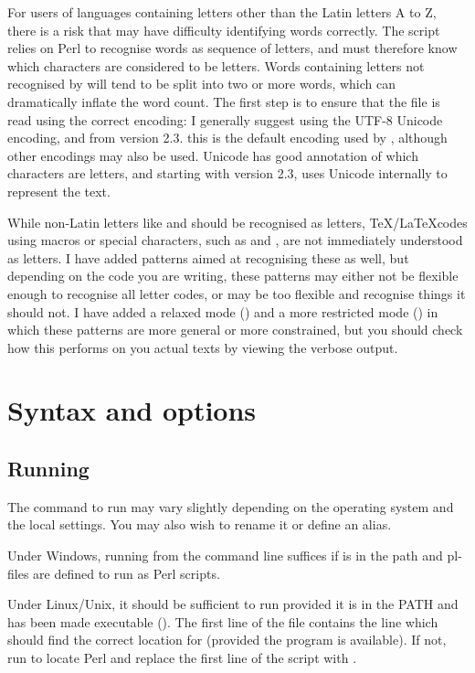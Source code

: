 \documentclass{article}
\begin{document}
For users of languages containing letters other than the Latin letters A to Z, there is a risk that \TeXcount{} may have difficulty identifying words correctly. The script relies on Perl to recognise words as sequence of letters, and must therefore know which characters are considered to be letters. Words containing letters not recognised by \TeXcount{} will tend to be split into two or more words, which can dramatically inflate the word count. The first step is to ensure that the file is read using the correct encoding: I generally suggest using the UTF-8 Unicode encoding, and from version 2.3. this is the default encoding used by \TeXcount{}, although other encodings may also be used. Unicode has good annotation of which characters are letters, and starting with version 2.3, \TeXcount{} uses Unicode internally to represent the text.

While non-Latin letters like \code{\aa} and  should be recognised as letters, \TeX/\LaTeX codes using macros or special characters, such as  and , are not immediately understood as letters. I have added patterns aimed at recognising these as well, but depending on the code you are writing, these patterns may either not be flexible enough to recognise all letter codes, or may be too flexible and recognise things it should not. I have added a relaxed mode () and a more restricted mode () in which these patterns are more general or more constrained, but you should check how this performs on you actual texts by viewing the verbose output.


\section{Syntax and options}

\subsection{Running \TeXcount{}}

The command to run \TeXcount{} may vary slightly depending on the operating system and the local settings. You may also wish to rename it or define an alias.

Under Windows, running  from the command line suffices if  is in the path and pl-files are defined to run as Perl scripts.

Under Linux/Unix, it should be sufficient to run  provided it is in the PATH and has been made executable (). The first line of the file contains the line  which should find the correct location for  (provided the program  is available). If not, run  to locate Perl and replace the first line of the script with .
\end{document}
